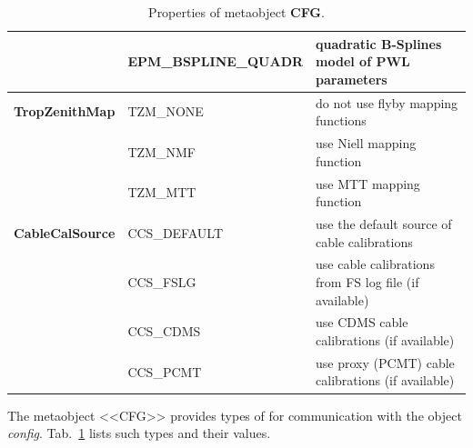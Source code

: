 \documentclass [10pt,letterpaper]{report}
\begin{document}
\begin{table}[htb]
\begin{tabular}{llp{}}
                                & EPM\_BSPLINE\_QUADR & quadratic B-Splines  model of PWL parameters\\
\hline
  {\bf TropZenithMap}           & TZM\_NONE           & do not use flyby mapping functions\\
                                & TZM\_NMF            & use Niell mapping function\\
                                & TZM\_MTT            & use MTT mapping function\\
\hline
  {\bf CableCalSource}          & CCS\_DEFAULT        & use the default source of cable calibrations\\
                                & CCS\_FSLG           & use cable calibrations from FS log file (if available)\\
                                & CCS\_CDMS           & use CDMS cable calibrations (if available)\\
                                & CCS\_PCMT           & use proxy (PCMT) cable calibrations (if available)\\
\hline
\end{tabular}
\caption{Properties of metaobject {\bf CFG}.}
\label{tab-scr-config-meta}
\end{table}

The metaobject <<CFG>> provides types of for communication with the object {\sl config}.
Tab.~\ref{tab-scr-config-meta} lists such types and their values.
\end{document}
